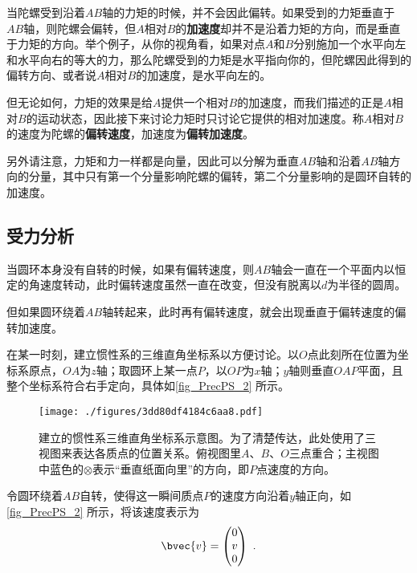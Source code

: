当陀螺受到沿着$AB$轴的力矩的时候，并不会因此偏转。如果受到的力矩垂直于$AB$轴，则陀螺会偏转，但$A$相对$B$的\textbf{加速度}却并不是沿着力矩的方向，而是垂直于力矩的方向。举个例子，从你的视角看，如果对点$A$和$B$分别施加一个水平向左和水平向右的等大的力，那么陀螺受到的力矩是水平指向你的，但陀螺因此得到的偏转方向、或者说$A$相对$B$的加速度，是水平向左的。



但无论如何，力矩的效果是给$A$提供一个相对$B$的加速度，而我们描述的正是$A$相对$B$的运动状态，因此接下来讨论力矩时只讨论它提供的相对加速度。称$A$相对$B$的速度为陀螺的\textbf{偏转速度}，加速度为\textbf{偏转加速度}。

另外请注意，力矩和力一样都是向量，因此可以分解为垂直$AB$轴和沿着$AB$轴方向的分量，其中只有第一个分量影响陀螺的偏转，第二个分量影响的是圆环自转的加速度。




\subsection{受力分析}



当圆环本身没有自转的时候，如果有偏转速度，则$AB$轴会一直在一个平面内以恒定的角速度转动，此时偏转速度虽然一直在改变，但没有脱离以$d$为半径的圆周。

但如果圆环绕着$AB$轴转起来，此时再有偏转速度，就会出现垂直于偏转速度的偏转加速度。


在某一时刻，建立惯性系的三维直角坐标系以方便讨论。以$O$点此刻所在位置为坐标系原点，$OA$为$z$轴；取圆环上某一点$P$，以$OP$为$x$轴；$y$轴则垂直$OAP$平面，且整个坐标系符合右手定向，具体如\autoref{fig_PrecPS_2} 所示。





\begin{figure}[ht]
\centering
\texttt{[image: ./figures/3dd80df4184c6aa8.pdf]}
\caption{建立的惯性系三维直角坐标系示意图。为了清楚传达，此处使用了三视图来表达各质点的位置关系。俯视图里$A$、$B$、$O$三点重合；主视图中蓝色的$\otimes$表示“垂直纸面向里”的方向，即$P$点速度的方向。} \label{fig_PrecPS_2}
\end{figure}

令圆环绕着$AB$自转，使得这一瞬间质点$P$的速度方向沿着$y$轴正向，如\autoref{fig_PrecPS_2} 所示，将该速度表示为
\begin{equation}
\bvec{v} = 
\begin{pmatrix}
0\\v\\0
\end{pmatrix}
~. 
\end{equation}

